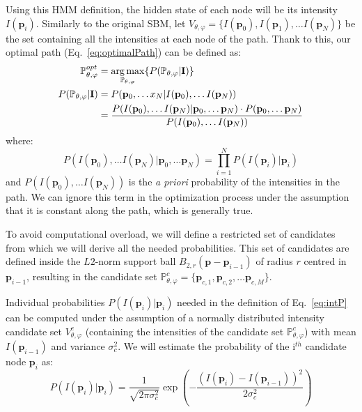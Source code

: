 Using this \ac{HMM} definition, the hidden state of each node will be its intensity $I(\mathbf{p}_i)$. Similarly to the original \ac{SBM}, let $V_{\theta,\varphi} = \{I(\mathbf{p}_0), I(\mathbf{p}_1), \dots I(\mathbf{p}_N)\}$ be the set containing all the intensities at each node of the path. Thank to this, our optimal path (Eq.~\ref{eq:optimalPath}) can be defined as:
\begin{align}
\mathbb{P}_{\theta,\varphi}^{opt} & = \operatorname*{arg\,max}_{\mathbb{P}_{\theta,\varphi}} \{P(\mathbb{P}_{\theta,\varphi}|\mathbf{I})\}\\
P(\mathbb{P}_{\theta,\varphi}|\mathbf{I}) & = P(\mathbf{p}_0, \dots x_N| I(\mathbf{p}_0), \dots I(\mathbf{p}_N))\\
& = \frac{P(I(\mathbf{p}_0), \dots I(\mathbf{p}_N)|\mathbf{p}_0, \dots \mathbf{p}_N)\cdot P(\mathbf{p}_0, \dots \mathbf{p}_N)}{P(I(\mathbf{p}_0), \dots I(\mathbf{p}_N))}\label{eq:final}
\end{align}
where:
\begin{equation}\label{eq:intP}
P(I(\mathbf{p}_0), \dots I(\mathbf{p}_N)|\mathbf{p}_0, \dots \mathbf{p}_N)  = \prod_{i=1}^{N} P (I(\mathbf{p}_i)|\mathbf{p}_i)
\end{equation}
and $P(I(\mathbf{p}_0), \dots I(\mathbf{p}_N))$ is the \textit{a priori} probability of the intensities in the path. We can ignore this term in the optimization process under the assumption that it is constant along the path, which is generally true. 

To avoid computational overload, we will define a restricted set of candidates from which we will derive all the needed probabilities. This set of candidates are defined inside the $L2$-norm support ball $B_{2,r}(\mathbf{p}-\mathbf{p}_{i-1})$ of radius $r$ centred in $\mathbf{p}_{i-1}$, resulting in the candidate set $\mathbb{P}_{\theta,\varphi}^c = \{\mathbf{p}_{c,1}, \mathbf{p}_{c,2}, \dots \mathbf{p}_{c,M} \}$. 

Individual probabilities $P (I(\mathbf{p}_i)|\mathbf{p}_i)$ needed in the definition of Eq.~\ref{eq:intP} can be computed under the assumption of a normally distributed intensity candidate set $V_{\theta,\varphi}^c$ (containing the intensities of the candidate set $\mathbb{P}_{\theta,\varphi}^c$) with mean $I(\mathbf{p}_{i-1})$ and variance $\sigma_c^2$. We will estimate the probability of the i$^{th}$ candidate node $\mathbf{p}_i$ as: 
\begin{equation}\label{eq:intensity}
P(I(\mathbf{p}_i)|\mathbf{p}_i) =\frac{1}{\sqrt{2\pi \sigma_c^2}}\exp\left(-\frac{(I(\mathbf{p}_i)-I(\mathbf{p}_{i-1}))^2}{2\sigma_c^2}\right)
\end{equation}

